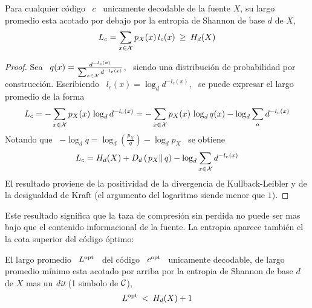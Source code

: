 \begin{teorema}
  Para cualquier  c\'odigo \  $c$ \  unicamente decodable de  la fuente  $X$, su
  largo promedio esta acotado por debajo  por la entropia de Shannon de base $d$
  de $X$,
  \[
  L_c = \sum_{x \in \mathcal{X}} p_X(x) \, l_c(x) \: \ge \: H_d(X)
  \]
\end{teorema}
%
\begin{proof}
  Sea \ $q(x)  = \frac{d^{-l_c(x)}}{\sum_{x \in \mathcal{X}} d^{-l_c(x)}}$,  \ siendo una
  distribuci\'on de  probabilidad por  construcci\'on.  Escribiendo \  $l_c(x) =
  \log_d d^{-l_c(x)}$, \ se puede expresar el largo promedio de la forma
  \[
  L_c =  - \sum_{x  \in \mathcal{X}}  p_X(x) \, \log_d  d^{-l_c(x)} =  - \sum_{x  \in \mathcal{X}}
  p_X(x) \, \log_d q(x) - \log_d \sum_a d^{-l_c(x)}
  \]
  Notando que \ $- \log_d q  = \log_d \left( \frac{p_X}{q} \right) - \log_d p_X$
  \ se obtiene
  \[
  L_c = H_d(X)  + D_d\left( \left.  p_X \right\| q \right)  - \log_d \sum_{x \in
    \mathcal{X}} d^{-l_c(x)}
  \]
  El resultado proviene de la  positividad de la divergencia de Kullback-Leibler
  y de  la desigualdad  de Kraft  (el argumento del  logaritmo siende  menor que
  $1$).
\end{proof}
%
Este resultado  significa que la taza  de compresi\'on sin perdida  no puede ser
mas  bajo que  el  contenido informacional  de  la fuente.  La entropia  aparece
tambi\'en el la cota superior del c\'odigo \'optimo:
%
\begin{teorema}
  El largo promedio \ $L^{\mathrm{opt}}$ \ del c\'odigo \ $c^{\mathrm{opt}}$ \ unicamente decodable,
  de largo promedio m\'inimo esta acotado  por arriba por la entropia de Shannon
  de base $d$ de $X$ mas un {\it dit} (1 simbolo de $\mathcal{C}$), 
  \[
  L^{\mathrm{opt}} \: < \: H_d(X) + 1
  \]
\end{teorema}
%
